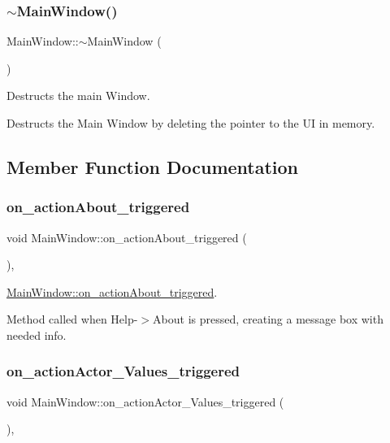 \subsubsection{\texorpdfstring{$\sim$\+Main\+Window()}{~MainWindow()}}
{\footnotesize\ttfamily Main\+Window\+::$\sim$\+Main\+Window (\begin{DoxyParamCaption}{ }\end{DoxyParamCaption})}



Destructs the main Window. 

Destructs the Main Window by deleting the pointer to the UI in memory. 

\subsection{Member Function Documentation}
\mbox{\label{class_main_window_a4f3ebda1ba39e0ef4d678b44893c9c7f}} 
\subsubsection{\texorpdfstring{on\+\_\+action\+About\+\_\+triggered}{on\_actionAbout\_triggered}}
{\footnotesize\ttfamily void Main\+Window\+::on\+\_\+action\+About\+\_\+triggered (\begin{DoxyParamCaption}{ }\end{DoxyParamCaption})\hspace{0.3cm}{\ttfamily [private]}, {\ttfamily [slot]}}



\hyperlink{class_main_window_a4f3ebda1ba39e0ef4d678b44893c9c7f}{Main\+Window\+::on\+\_\+action\+About\+\_\+triggered}. 

Method called when Help-\/$>$About is pressed, creating a message box with needed info. \mbox{\label{class_main_window_a5aa38fdd3e3ea03f2fc2858d9110f2c6}} 
\subsubsection{\texorpdfstring{on\+\_\+action\+Actor\+\_\+\+Values\+\_\+triggered}{on\_actionActor\_Values\_triggered}}
{\footnotesize\ttfamily void Main\+Window\+::on\+\_\+action\+Actor\+\_\+\+Values\+\_\+triggered (\begin{DoxyParamCaption}{ }\end{DoxyParamCaption})\hspace{0.3cm}{\ttfamily [private]}, {\ttfamily [slot]}}



